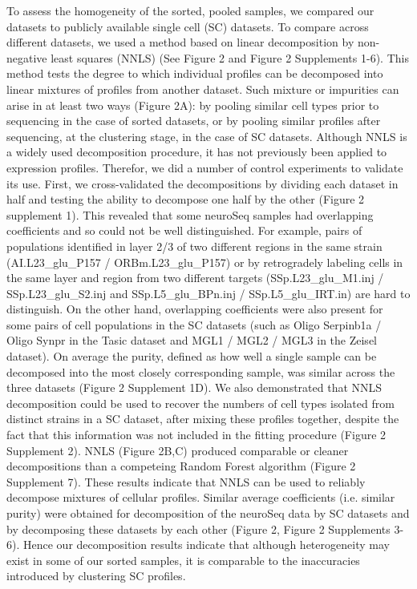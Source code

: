 To assess the homogeneity of the sorted, pooled samples, we compared our datasets to publicly available single cell (SC) datasets. To compare across different datasets, we used a method based on linear decomposition by non-negative least squares (NNLS) (See Figure 2 and Figure 2 Supplements 1-6). This method tests the degree to which individual profiles can be decomposed into linear mixtures of profiles from another dataset. Such mixture or impurities can arise in at least two ways (Figure 2A): by pooling similar cell types prior to sequencing in the case of sorted datasets, or by pooling similar profiles after sequencing, at the clustering stage, in the case of SC datasets. Although NNLS is a widely used decomposition procedure, it has not previously been applied to expression profiles. Therefor, we did a number of control experiments to validate its use. First, we cross-validated the decompositions by dividing each dataset in half and testing the ability to decompose one half by the other (Figure 2 supplement 1). This revealed that some neuroSeq samples had overlapping coefficients and so could not be well distinguished. For example, pairs of populations identified in layer 2/3 of two different regions in the same strain (AI.L23\_glu\_P157 / ORBm.L23\_glu\_P157) or by retrogradely labeling cells in the same layer and region from two different targets (SSp.L23\_glu\_M1.inj / SSp.L23\_glu\_S2.inj and SSp.L5\_glu\_BPn.inj / SSp.L5\_glu\_IRT.in) are hard to distinguish. On the other hand, overlapping coefficients were also present for some pairs of cell populations in the SC datasets (such as Oligo Serpinb1a / Oligo Synpr in the Tasic dataset and MGL1 / MGL2 / MGL3 in the Zeisel dataset). On average the purity, defined as how well a single sample can be decomposed into the most closely corresponding sample, was similar across the three datasets (Figure 2 Supplement 1D). We also demonstrated that NNLS decomposition could be used to recover the numbers of cell types isolated from distinct strains in a SC dataset, after mixing these profiles together, despite the fact that this information was not included in the fitting procedure (Figure 2 Supplement 2). NNLS (Figure 2B,C) produced comparable or cleaner decompositions than a competeing Random Forest algorithm (Figure 2 Supplement 7). These results indicate that NNLS can be used to reliably decompose mixtures of cellular profiles. Similar average coefficients (i.e. similar purity) were obtained for decomposition of the neuroSeq data by SC datasets and by decomposing these datasets by each other (Figure 2, Figure 2 Supplements 3-6). Hence our decomposition results indicate that although heterogeneity may exist in some of our sorted samples, it is comparable to the inaccuracies introduced by clustering SC profiles.

